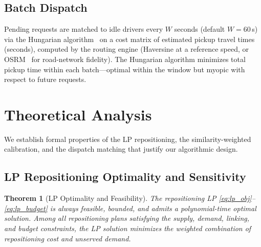 \documentclass[conference,10pt]{IEEEtran}
\newtheorem{theorem}{Theorem}
\begin{document}
\subsection{Batch Dispatch}
\label{sec:method:dispatch}

Pending requests are matched to idle drivers every $W$ seconds
(default $W = 60$\,s) via the Hungarian algorithm~\cite{kuhn1955hungarian}
on a cost matrix of estimated pickup travel times (seconds), computed
by the routing engine (Haversine at a reference speed, or OSRM~\cite{luxen2011osrm} for
road-network fidelity). The Hungarian algorithm minimizes total pickup
time within each batch---optimal within the window but myopic with
respect to future requests.


\section{Theoretical Analysis}
\label{sec:theory}

We establish formal properties of the LP repositioning, the similarity-weighted
calibration, and the dispatch matching that justify our algorithmic design.

\subsection{LP Repositioning Optimality and Sensitivity}

\begin{theorem}[LP Optimality and Feasibility]
\label{thm:lp_optimality}
The repositioning LP \eqref{eq:lp_obj}--\eqref{eq:lp_budget} is always
feasible, bounded, and admits a polynomial-time optimal solution.
Among all repositioning plans satisfying the supply, demand, linking,
and budget constraints, the LP solution minimizes the weighted
combination of repositioning cost and unserved demand.
\end{theorem}
\end{document}
